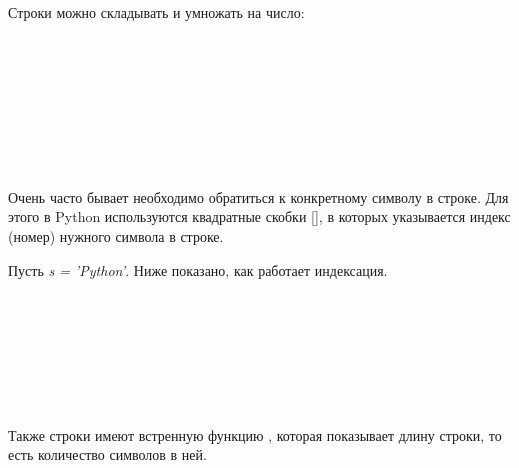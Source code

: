 Строки можно складывать и умножать на число:

\begin{flushleft}
	 \\
	 \\
	 \\
	 \\
	 \\
	\vspace{1cm}
	 \\
	 \\
\end{flushleft}

Очень часто бывает необходимо обратиться к конкретному символу в строке. Для этого в Python используются квадратные скобки [], в которых указывается индекс (номер) нужного символа в строке.

Пусть \colorbox[rgb]{0.95, 0.95, 0.95}{\textit{s = 'Python'}}. Ниже показано, как работает индексация.

\begin{flushleft}
	 \\
	 \\
	 \\
	 \\
	 \\
	 \\
\end{flushleft}

Также строки имеют встренную функцию , которая показывает длину строки, то есть количество символов в ней.

\begin{flushleft}
	 \\
	 \\
	\vspace{1cm}
\end{flushleft}

